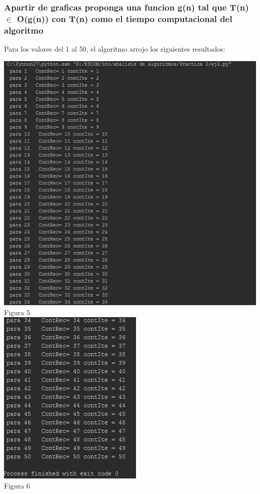 \documentclass[spanish]{article}
\begin{document}
	\subsubsection{Apartir de graficas proponga una funcion g(n) tal que T(n) $\in$ O(g(n)) con T(n) como el tiempo computacional del algoritmo }
Para los valores del 1 al 50, el algoritmo arrojo los siguientes resultados:\\
\begin{center}
\includegraphics{./imagenes/suma1.png}\\
		Figura 5\\
\includegraphics{./imagenes/suma2.png}\\
		Figura 6\\
	\end{center}
\end{document}

